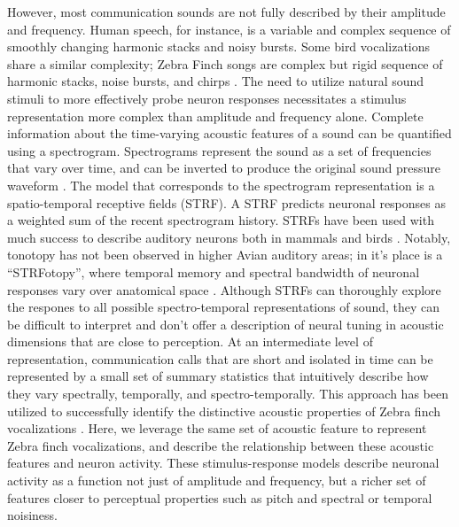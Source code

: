 However, most communication sounds are not fully described by their amplitude and frequency. Human speech, for instance, is a variable and complex sequence of smoothly changing harmonic stacks and noisy bursts. Some bird vocalizations share a similar complexity; Zebra Finch songs are complex but rigid sequence of harmonic stacks, noise bursts, and chirps \cite{Elie2015b}. The need to utilize natural sound stimuli to more effectively probe neuron responses necessitates a stimulus representation more complex than amplitude and frequency alone. Complete information about the time-varying acoustic features of a sound can be quantified using a spectrogram. Spectrograms represent the sound as a set of frequencies that vary over time, and can be inverted to produce the original sound pressure waveform \cite{Cohen1995}. The model that corresponds to the spectrogram representation is a spatio-temporal receptive fields (STRF). A STRF predicts neuronal responses as a weighted sum of the recent spectrogram history. STRFs have been used with much success to describe auditory neurons both in mammals and birds \cite{Theunissen2000}. Notably, tonotopy has not been observed in higher Avian auditory areas; in it’s place is a “STRFotopy”, where temporal memory and spectral bandwidth of neuronal responses vary over anatomical space \cite{Kim2011}. Although STRFs can thoroughly explore the respones to all possible spectro-temporal representations of sound, they can be difficult to interpret and don't offer a description of neural tuning in acoustic dimensions that are close to perception.
At an intermediate level of representation, communication calls that are short and isolated in time can be represented by a small set of summary statistics that intuitively describe how they vary spectrally, temporally, and spectro-temporally. This approach has been utilized to successfully identify the distinctive acoustic properties of Zebra finch vocalizations \cite{Elie2015b}. Here, we leverage the same set of acoustic feature to represent Zebra finch vocalizations, and describe the relationship between these acoustic features and neuron activity. These stimulus-response models describe neuronal activity as a function not just of amplitude and frequency, but a richer set of features closer to perceptual properties such as pitch and spectral or temporal noisiness.

